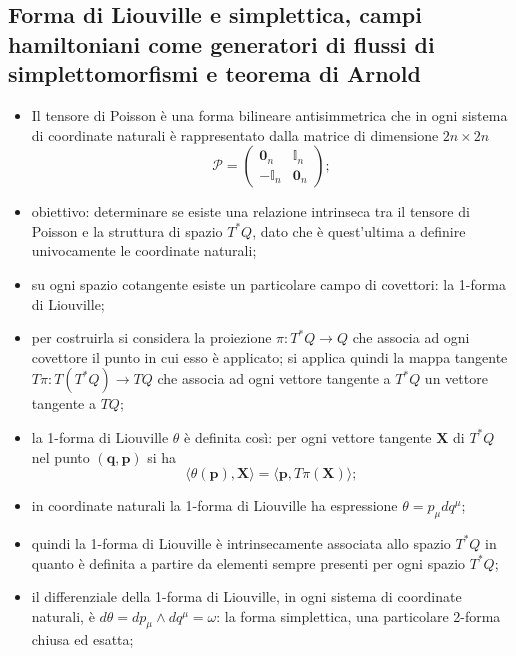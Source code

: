 \documentclass{article}
\theoremstyle{remark}
\begin{document}
\subsection{Forma di Liouville e simplettica, campi hamiltoniani come generatori di flussi di simplettomorfismi e teorema di Arnold}
\begin{itemize}
    \item Il tensore di Poisson è una forma bilineare antisimmetrica che in ogni sistema di coordinate naturali è rappresentato dalla matrice di dimensione $2n\times2n$
    \begin{equation}
        \mathcal{P} = 
        \begin{pmatrix}
        \mathbf{0}_n & \mathbb{I}_n \\
        -\mathbb{I}_n & \mathbf{0}_n
        \end{pmatrix};
    \end{equation}
    \item obiettivo: determinare se esiste una relazione intrinseca tra il tensore di Poisson e la struttura di spazio $T^*Q$, dato che è quest'ultima a definire univocamente le coordinate naturali;
    \item su ogni spazio cotangente esiste un particolare campo di covettori: la 1-forma di Liouville;
    \item per costruirla si considera la proiezione $\pi:T^*Q\to Q$ che associa ad ogni covettore il punto in cui esso è applicato; si applica quindi la mappa tangente $T\pi:T(T^*Q)\to TQ$ che associa ad ogni vettore tangente a $T^*Q$ un vettore tangente a $TQ$;
    \item la 1-forma di Liouville $\theta$ è definita così: per ogni vettore tangente $\bm{X}$ di $T^*Q$ nel punto $\bm{(q,p)}$ si ha
    \begin{equation}
        \langle\theta(\bm{p}),\bm{X}\rangle=\langle\bm{p},T\pi(\bm{X})\rangle;
    \end{equation}
    \item in coordinate naturali la 1-forma di Liouville ha espressione $\theta=p_\mu dq^\mu$;
    \item quindi la 1-forma di Liouville è intrinsecamente associata allo spazio $T^*Q$ in quanto è definita a partire da elementi sempre presenti per ogni spazio $T^*Q$;
    \item il differenziale della 1-forma di Liouville, in ogni sistema di coordinate naturali, è $d\theta=dp_\mu\wedge dq^\mu=\omega$: la forma simplettica, una particolare 2-forma chiusa ed esatta;

\end{itemize}
\end{document}
